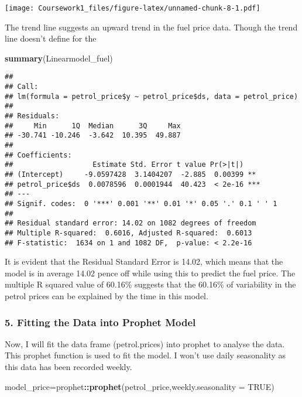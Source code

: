 \documentclass[
]{article}
\newenvironment{Shaded}{\begin{snugshade}}{\end{snugshade}}
\newcommand{\AttributeTok}[1]{\textcolor[rgb]{0.13,0.29,0.53}{#1}}
\newcommand{\ConstantTok}[1]{\textcolor[rgb]{0.56,0.35,0.01}{#1}}
\newcommand{\FunctionTok}[1]{\textcolor[rgb]{0.13,0.29,0.53}{\textbf{#1}}}
\newcommand{\NormalTok}[1]{#1}
\newcommand{\OtherTok}[1]{\textcolor[rgb]{0.56,0.35,0.01}{#1}}
\newcommand{\SpecialCharTok}[1]{\textcolor[rgb]{0.81,0.36,0.00}{\textbf{#1}}}
\begin{document}
\texttt{[image: Coursework1\_files/figure-latex/unnamed-chunk-8-1.pdf]}

The trend line suggests an upward trend in the fuel price data. Though
the trend line doesn't define for the

\begin{Shaded}
\begin{Highlighting}[]
\FunctionTok{summary}\NormalTok{(Linearmodel\_fuel)}
\end{Highlighting}
\end{Shaded}

\begin{verbatim}
## 
## Call:
## lm(formula = petrol_price$y ~ petrol_price$ds, data = petrol_price)
## 
## Residuals:
##     Min      1Q  Median      3Q     Max 
## -30.741 -10.246  -3.642  10.395  49.887 
## 
## Coefficients:
##                   Estimate Std. Error t value Pr(>|t|)    
## (Intercept)     -9.0597428  3.1404207  -2.885  0.00399 ** 
## petrol_price$ds  0.0078596  0.0001944  40.423  < 2e-16 ***
## ---
## Signif. codes:  0 '***' 0.001 '**' 0.01 '*' 0.05 '.' 0.1 ' ' 1
## 
## Residual standard error: 14.02 on 1082 degrees of freedom
## Multiple R-squared:  0.6016, Adjusted R-squared:  0.6013 
## F-statistic:  1634 on 1 and 1082 DF,  p-value: < 2.2e-16
\end{verbatim}

It is evident that the Residual Standard Error is 14.02, which means
that the model is in average 14.02 pence off while using this to predict
the fuel price. The multiple R squared value of 60.16\% suggests that
the 60.16\% of variability in the petrol prices can be explained by the
time in this model.

\hypertarget{fitting-the-data-into-prophet-model}{%
\subsubsection{5. Fitting the Data into Prophet
Model}\label{fitting-the-data-into-prophet-model}}

Now, I will fit the data frame (petrol.prices) into prophet to analyse
the data. This prophet function is used to fit the model. I won't use
daily seasonality as this data has been recorded weekly.

\begin{Shaded}
\begin{Highlighting}[]
\NormalTok{model\_price}\OtherTok{=}\NormalTok{prophet}\SpecialCharTok{::}\FunctionTok{prophet}\NormalTok{(petrol\_price,}\AttributeTok{weekly.seasonality =} \ConstantTok{TRUE}\NormalTok{)}
\end{Highlighting}
\end{Shaded}
\end{document}
